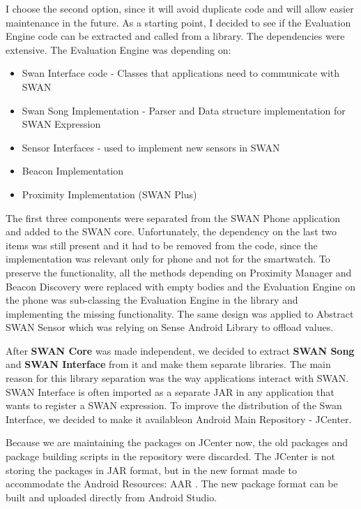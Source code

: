 I choose the second option, since it will avoid duplicate code and will allow easier maintenance in the future. As a starting point, I decided to see if the Evaluation Engine
code can be extracted and called from a library. The dependencies were extensive. The Evaluation Engine was depending on:
\begin{itemize}
 \item Swan Interface code - Classes that applications need to communicate with SWAN
 \item Swan Song Implementation - Parser and Data structure implementation for SWAN Expression
 \item Sensor Interfaces - used to implement new sensors in SWAN
 \item Beacon Implementation
 \item Proximity Implementation (SWAN Plus)
\end{itemize}

The first three components were separated from the SWAN Phone application and added to the SWAN core. Unfortunately, the dependency on the last two items
was still present and it had to be removed from the code, since the implementation was relevant only for phone and not for the smartwatch.
To preserve the functionality, all the methods depending on Proximity Manager and Beacon Discovery were replaced with empty bodies and the Evaluation Engine on
the phone was sub-classing the Evaluation Engine in the library and implementing the missing functionality.
The same design was applied to Abstract SWAN Sensor which was relying on Sense Android Library to offload values\cite{swan_layer}.

After \textbf{SWAN Core} was made independent, we decided to extract \textbf{SWAN Song} and \textbf{SWAN Interface} from it and make them separate libraries.
The main reason for this library separation was the way applications interact with SWAN. SWAN Interface is often imported as a separate JAR in any application that wants to register a 
SWAN expression. To improve the distribution of the Swan Interface, we decided to make it available\footnotemark  on Android Main Repository - JCenter\cite{jcenter}. 

Because we are maintaining the packages on JCenter now, the old packages and package building scripts  in the repository were discarded.
The JCenter  is not storing the packages in JAR format, but in the new format made to accommodate the Android Resources: AAR \cite{aar_format}. 
The new package format can be built and uploaded directly from Android Studio. 

